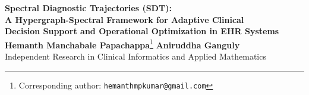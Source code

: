 \documentclass[10pt]{article}
\begin{document}
\thispagestyle{empty}

\begin{center}
  {\Large \textbf{Spectral Diagnostic Trajectories (SDT):}}\\[4pt]
  {\large \textbf{A Hypergraph-Spectral Framework for Adaptive Clinical}}\\[2pt]
  {\large \textbf{Decision Support and Operational Optimization in EHR Systems}}\\[12pt]
  {\textbf{Hemanth Manchabale Papachappa}}\thanks{Corresponding author: \texttt{hemanthmpkumar@gmail.com}} \quad
  {\textbf{Aniruddha Ganguly}}\\[4pt]
  {\small Independent Research in Clinical Informatics and Applied Mathematics}
\end{center}

\vspace{0.8em}
\end{document}
